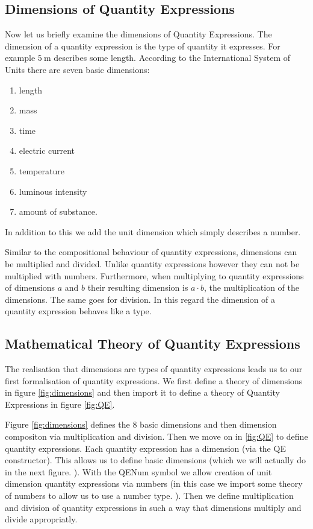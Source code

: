 \subsection{Dimensions of Quantity Expressions}
Now let us briefly examine the dimensions of Quantity Expressions. The dimension of a quantity expression is the type of quantity it expresses. For example $5\ \text{m}$ describes some length. According to the International System of Units there are seven basic dimensions:
\begin{enumerate}
  \item length
  \item mass
  \item time
  \item electric current
  \item temperature
  \item luminous intensity
  \item amount of substance.
\end{enumerate}

In addition to this we add the unit dimension which simply describes a number.

Similar to the compositional behaviour of quantity expressions, dimensions can be multiplied and divided. Unlike quantity expressions however they can not be multiplied with numbers. Furthermore, when multiplying to quantity expressions of dimensions $a$ and $b$ their resulting dimension is $a \cdot{} b$, the multiplication of the dimensions. The same goes for division. In this regard the dimension of a quantity expression behaves like a type.

\subsection{Mathematical Theory of Quantity Expressions}

The realisation that dimensions are types of quantity expressions leads us to our first formalisation of quantity expressions. We first define a theory of dimensions in figure \ref{fig:dimensions} and then import it to define a theory of Quantity Expressions in figure \ref{fig:QE}.





Figure \ref{fig:dimensions} defines the 8 basic dimensions and then dimension compositon via multiplication and division. Then we move on in \ref{fig:QE} to define quantity expressions. Each quantity expression has a dimension (via the QE constructor). This allows us to define basic dimensions (which we will actually do in the next figure. ). With the QENum symbol we allow creation of unit dimension quantity expressions via numbers (in this case we import some theory of numbers to allow us to use a number type. ). Then we define multiplication and division of quantity expressions in such a way that dimensions multiply and divide appropriatly.

